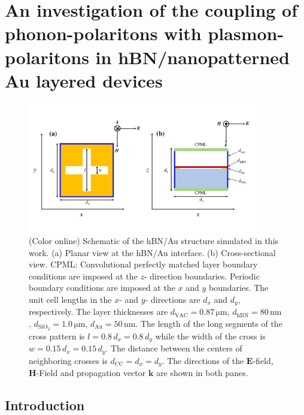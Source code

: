 \documentclass[reprint,
amsmath,amssymb,
aip,
jap,
floatfix,]{revtex4-2}
\begin{document}
\author{J. D. T. Heneghan}
\author{W. M. Dennis}

\date{\today}


	\chapter{An investigation of the coupling of phonon-polaritons with
plasmon-polaritons in hBN/nanopatterned Au layered devices}

	\begin{figure}[!htb]
	  \includegraphics[width=0.9\textwidth]{Figures/Fig1.pdf}
	  \caption{(Color online) Schematic of the hBN/Au structure simulated in this work. (a) Planar view at the hBN/Au interface. (b) Cross-sectional view. CPML: Convolutional perfectly matched layer boundary conditions are imposed at the $z$- direction boundaries. Periodic boundary conditions are imposed at the $x$ and $y$ boundaries. The unit cell lengths in the $x$- and $y$- directions are $d_{x} $ and $d_{y}$, respectively. The layer thicknesses are $d_\mathrm{VAC} = 0.87\, \si{\um}$, $d_\mathrm{hBN} = 80\, \si{\nm}$, $d_\mathrm{SiO_{2}} = 1.0\, \si{\um}$, $d_\mathrm{Au} = 50\, \si{\nm}$. The length of the long segments of the cross pattern is $l = 0.8 \, d_{x} = 0.8 \, d_{y}$ while the width of the cross is  $w = 0.15 \, d_{x} = 0.15 \, d_{y}$. The distance between the centers of neighboring crosses is $d_\mathrm{CC} = d_{x} = d_{y}$. The directions of the $\bm{E}$-field, $\bm{H}$-Field and propagation vector $\bm{k}$ are shown in both panes.}
	  \label{fig:1}
	\end{figure}
		\section{Introduction}
\end{document}

